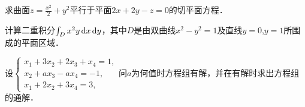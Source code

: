 \documentclass[plain,noanswer,medmath]{../../template/jnuexam}
\begin{document}
































\begin{problem}
求曲面$z = \frac{x^2}{2} + y^2$平行于平面$2x + 2y - z = 0$的切平面方程．
\end{problem}


\begin{problem}
计算二重积分$\int_D x^2 y\mathop{}\!\mathrm{d} x\mathop{}\!\mathrm{d} y$，其中$D$是由双曲线$x^2 - y^2 = 1$及直线$y = 0$,$y = 1$所围成的平面区域．
\end{problem}



















\begin{problem}
设$\begin{cases}
  x_1 + 3x_2 + 2x_3 + x_4 = 1, \\
  x_2 + ax_3 - ax_4 = - 1, \\
  x_1 + 2x_2 + 3x_4 = 3,
\end{cases}$问$a$为何值时方程组有解，并在有解时求出方程组的通解．
\end{problem}





\end{document}
